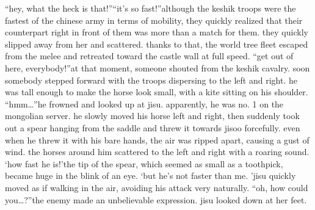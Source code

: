 “hey, what the heck is that!”“it’s so fast!”although the keshik troops were the fastest of the chinese army in terms of mobility, they quickly realized that their counterpart right in front of them was more than a match for them.
they quickly slipped away from her and scattered.
thanks to that, the world tree fleet escaped from the melee and retreated toward the castle wall at full speed.
“get out of here, everybody!”at that moment, someone shouted from the keshik cavalry.
 soon somebody stepped forward with the troops dispersing to the left and right.
he was tall enough to make the horse look small, with a kite sitting on his shoulder.
“hmm…”he frowned and looked up at jisu.
 apparently, he was no.
 1 on the mongolian server.
he slowly moved his horse left and right, then suddenly took out a spear hanging from the saddle and threw it towards jisoo forcefully.
even when he threw it with his bare hands, the air was ripped apart, causing a gust of wind.
the horses around him scattered to the left and right with a roaring sound.
‘how fast he is!’the tip of the spear, which seemed as small as a toothpick, became huge in the blink of an eye.
‘but he’s not faster than me.
’jisu quickly moved as if walking in the air, avoiding his attack very naturally.
“oh, how could you…?”the enemy made an unbelievable expression.
jisu looked down at her feet.

